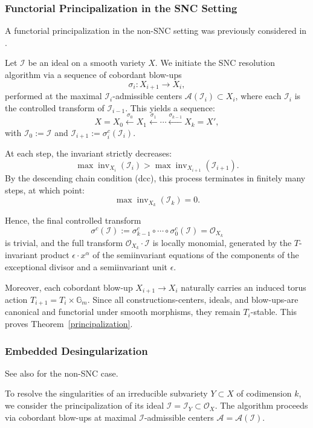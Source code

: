 \documentclass{amsart}
\newcommand{\inv}{{\operatorname{inv}}}
\begin{document}
\subsubsection{Functorial Principalization in the SNC Setting}
\smallskip
A functorial principalization in the non-SNC setting was previously considered in \cite{ATW-weighted}.

Let \( \mathcal{I} \) be an ideal on a smooth variety \( X \). We initiate the SNC resolution algorithm via a sequence of cobordant blow-ups
\[
\sigma_i: X_{i+1} \to X_i,
\]
performed at the maximal \( \mathcal{I}_i \)-admissible centers \( \mathcal{A}(\mathcal{I}_i) \subset X_i \), where each \( \mathcal{I}_i \) is the controlled transform of \( \mathcal{I}_{i-1} \). This yields a sequence:
\[
X = X_0 \xleftarrow{\sigma_0} X_1 \xleftarrow{\sigma_1} \cdots \xleftarrow{\sigma_{k-1}} X_k = X',
\]
with \( \mathcal{I}_0 := \mathcal{I} \) and \( \mathcal{I}_{i+1} := \sigma_i^c(\mathcal{I}_i) \).

At each step, the invariant strictly decreases:
\[
\max \inv_{X_i}(\mathcal{I}_i) > \max \inv_{X_{i+1}}(\mathcal{I}_{i+1}).
\]
By the descending chain condition (dcc), this process terminates in finitely many steps, at which point:
\[
\max \inv_{X_k}(\mathcal{I}_k) = 0.
\]

Hence, the final controlled transform
\[
\sigma^c(\mathcal{I}) := \sigma_{k-1}^c \circ \cdots \circ \sigma_0^c(\mathcal{I}) = \mathcal{O}_{X_k}
\]
is trivial, and the full transform \( \mathcal{O}_{X_k} \cdot \mathcal{I} \) is locally monomial, generated by the $T$-invariant product $\epsilon\cdot x^\alpha$ of the semiinvariant equations of the components of the exceptional divisor and a semiinvariant unit $\epsilon$.

Moreover, each cobordant blow-up \( X_{i+1} \to X_i \) naturally carries an induced torus action \( T_{i+1} = T_i \times \mathbb{G}_m \). Since all constructions-centers, ideals, and blow-ups-are canonical and functorial under smooth morphisms, they remain \( T_i \)-stable. This proves Theorem~\ref{principalization}.

\subsubsection{Embedded Desingularization}
\smallskip
See also \cite{ATW-weighted} for the non-SNC case.

To resolve the singularities of an irreducible subvariety \( Y \subset X \) of codimension \( k \), we consider the principalization of its ideal \( \mathcal{I} = \mathcal{I}_Y \subset \mathcal{O}_X \). The algorithm proceeds via cobordant blow-ups at maximal \( \mathcal{I} \)-admissible centers \( \mathcal{A} = \mathcal{A}(\mathcal{I}) \).
\end{document}
